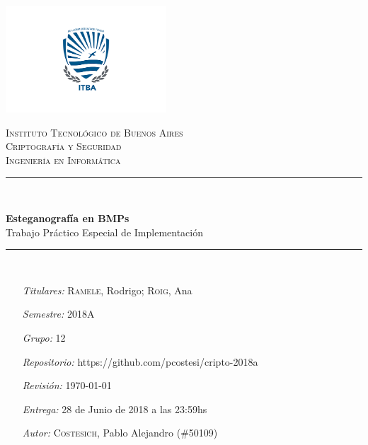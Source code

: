 \begin{titlepage}
\thispagestyle{empty}
\newcommand{\HRule}{\rule{\linewidth}{0.5mm}}
\hspace{1cm}
\center

\includegraphics[width = 60mm]{itba-escudo.png}

\textsc{\Large Instituto Tecnol\'ogico de Buenos Aires}\\[1.4cm]
\textsc{\huge Criptografía y Seguridad}\\[0.8cm]
\MSonehalfspacing
\textsc{\Large Ingenier\'ia en Inform\'atica}\\[1.0cm]

\HRule\\[0.4cm]
\MSdoublespacing

{ \huge \bfseries Esteganografía en BMPs}\\[0.2cm]
{ \large Trabajo Pr\'actico Especial de Implementación}\\[0.3cm]

\HRule \\[2.4cm]
\MSonehalfspacing

\begin{minipage}[t]{0.8\textwidth}
	\begin{itemize}
	\item[\emph{Titulares:}] \textsc{Ramele}, Rodrigo;  \textsc{Roig}, Ana 
	\item[\emph{Semestre:}] 2018A
	\item[\emph{Grupo:}] 12
	\item[\emph{Repositorio:}] https://github.com/pcostesi/cripto-2018a
	\item[\emph{Revisión:}] \today
    \item[\emph{Entrega:}] 28 de Junio de 2018 a las 23:59hs
    \item[\emph{Autor:}]
    	\textsc{Costesich}, Pablo Alejandro (\#50109)
    \end{itemize}
\end{minipage}

\end{titlepage}
\restoregeometry
{}
